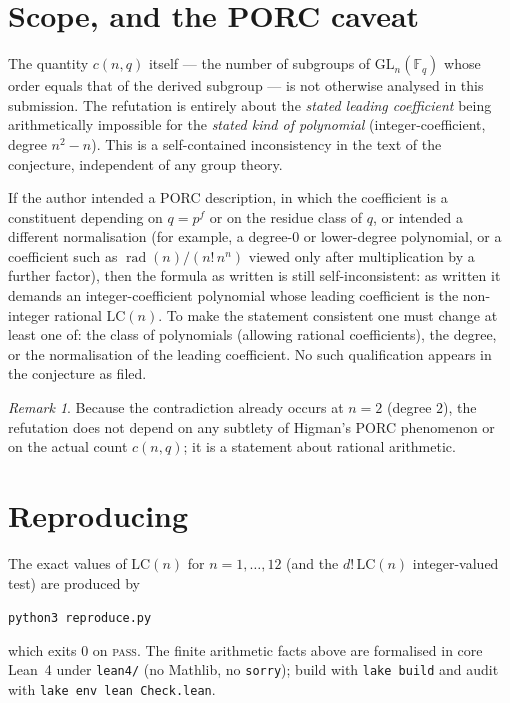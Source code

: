 \documentclass[11pt]{article}
\theoremstyle{remark}
\newtheorem*{remark}{Remark}
\newcommand{\GL}{\mathrm{GL}}
\newcommand{\Fq}{\mathbb{F}_q}
\newcommand{\LC}{\mathrm{LC}}
\DeclareMathOperator{\rad}{rad}
\begin{document}
\section{Scope, and the PORC caveat}

The quantity $c(n,q)$ itself --- the number of subgroups of $\GL_n(\Fq)$ whose
order equals that of the derived subgroup --- is not otherwise analysed in this
submission. The refutation is entirely about the \emph{stated leading
coefficient} being arithmetically impossible for the \emph{stated kind of
polynomial} (integer-coefficient, degree $n^2-n$). This is a self-contained
inconsistency in the text of the conjecture, independent of any group theory.

If the author intended a PORC description, in which the coefficient is a
constituent depending on $q=p^f$ or on the residue class of $q$, or intended a
different normalisation (for example, a degree-$0$ or lower-degree polynomial,
or a coefficient such as $\rad(n)/(n!\,n^n)$ viewed only after multiplication by
a further factor), then the formula as written is still self-inconsistent: as
written it demands an integer-coefficient polynomial whose leading coefficient
is the non-integer rational $\LC(n)$. To make the statement consistent one must
change at least one of: the class of polynomials (allowing rational
coefficients), the degree, or the normalisation of the leading coefficient. No
such qualification appears in the conjecture as filed.

\begin{remark}
Because the contradiction already occurs at $n=2$ (degree $2$), the refutation
does not depend on any subtlety of Higman's PORC phenomenon or on the actual
count $c(n,q)$; it is a statement about rational arithmetic.
\end{remark}

\section*{Reproducing}

The exact values of $\LC(n)$ for $n=1,\dots,12$ (and the $d!\,\LC(n)$
integer-valued test) are produced by
\begin{center}
\texttt{python3 reproduce.py}
\end{center}
which exits $0$ on \textsc{pass}. The finite arithmetic facts above are
formalised in core Lean~4 under \texttt{lean4/} (no Mathlib, no \texttt{sorry});
build with \texttt{lake build} and audit with \texttt{lake env lean Check.lean}.
\end{document}
